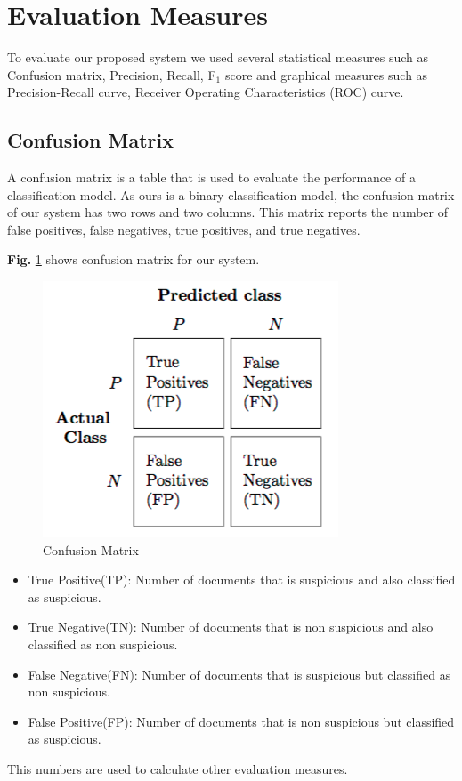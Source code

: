 \section{\textbf{Evaluation Measures}}
To evaluate our proposed system we used several statistical measures such as Confusion matrix, Precision, Recall, F$_1$ score and graphical measures such as Precision-Recall curve, Receiver Operating Characteristics (ROC) curve.
\subsection{\textbf{Confusion Matrix}}
A confusion matrix is a table that is used to evaluate the performance of a classification model. As ours is a binary classification model, the confusion matrix of our system has two rows and two columns. This matrix reports the number of false positives, false negatives, true positives, and true negatives.
\par
\vspace{0.3cm}
\noindent
\textbf{Fig.} \ref{fig:CM} shows confusion matrix for our system.
\begin{figure}[h!]
    \centering
    \includegraphics[scale=0.50]{Figures/confusion_matrix_1.png}
    \caption{Confusion Matrix}
    \label{fig:CM}
\end{figure}
\begin{itemize}
    \item True Positive(TP): Number of documents that is suspicious and also classified as suspicious.\vspace{0.2cm}
    \item True Negative(TN): Number of documents that is non suspicious and also classified as non suspicious.\vspace{0.2cm}
    \item False Negative(FN): Number of documents that is suspicious but classified as non suspicious.\vspace{0.2cm}
    \item False Positive(FP): Number of documents that is non suspicious but classified as suspicious. 
\end{itemize}
\noindent
This numbers are used to calculate other evaluation measures.

